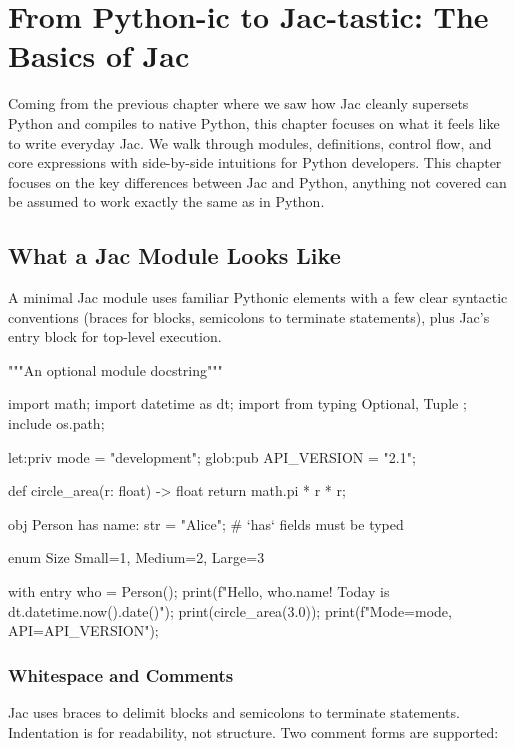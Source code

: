 \chapter{From Python-ic to Jac-tastic: The Basics of Jac}

Coming from the previous chapter where we saw how Jac cleanly supersets Python and compiles to native Python, this chapter focuses on what it feels like to write everyday Jac. We walk through modules, definitions, control flow, and core expressions with side-by-side intuitions for Python developers. This chapter focuses on the key differences between Jac and Python, anything not covered can be assumed to work exactly the same as in Python.

\section{What a Jac Module Looks Like}

A minimal Jac module uses familiar Pythonic elements with a few clear syntactic conventions (braces for blocks, semicolons to terminate statements), plus Jac's entry block for top-level execution.

\begin{jacblock}
"""An optional module docstring"""

import math;
import datetime as dt;
import from typing { Optional, Tuple };
include os.path;

let:priv mode = "development";
glob:pub API_VERSION = "2.1";

def circle_area(r: float) -> float {
    return math.pi * r * r;
}

obj Person {
    has name: str = "Alice";   # `has` fields must be typed
}

enum Size { Small=1, Medium=2, Large=3 }

with entry {
    who = Person();
    print(f"Hello, {who.name}! Today is {dt.datetime.now().date()}");
    print(circle_area(3.0));
    print(f"Mode={mode}, API={API_VERSION}");
}
\end{jacblock}

\subsection{Whitespace and Comments}

Jac uses braces to delimit blocks and semicolons to terminate statements. Indentation is for readability, not structure. Two comment forms are supported:

